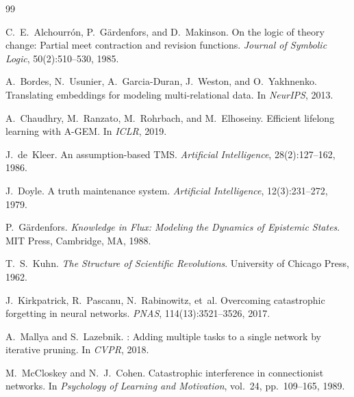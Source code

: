 \documentclass[11pt,a4paper]{article}
\theoremstyle{definition}
\begin{document}

\begin{thebibliography}{99}

C.~E.~Alchourr\'{o}n, P.~G\"ardenfors, and D.~Makinson.
\newblock On the logic of theory change: Partial meet contraction and revision functions.
\newblock \emph{Journal of Symbolic Logic}, 50(2):510--530, 1985.

A.~Bordes, N.~Usunier, A.~Garcia-Duran, J.~Weston, and O.~Yakhnenko.
\newblock Translating embeddings for modeling multi-relational data.
\newblock In \emph{NeurIPS}, 2013.

A.~Chaudhry, M.~Ranzato, M.~Rohrbach, and M.~Elhoseiny.
\newblock Efficient lifelong learning with {A-GEM}.
\newblock In \emph{ICLR}, 2019.

J.~de~Kleer.
\newblock An assumption-based {TMS}.
\newblock \emph{Artificial Intelligence}, 28(2):127--162, 1986.

J.~Doyle.
\newblock A truth maintenance system.
\newblock \emph{Artificial Intelligence}, 12(3):231--272, 1979.

P.~G\"{a}rdenfors.
\newblock \emph{Knowledge in Flux: Modeling the Dynamics of Epistemic States}.
\newblock MIT Press, Cambridge, MA, 1988.

T.~S.~Kuhn.
\newblock \emph{The Structure of Scientific Revolutions}.
\newblock University of Chicago Press, 1962.

J.~Kirkpatrick, R.~Pascanu, N.~Rabinowitz, et~al.
\newblock Overcoming catastrophic forgetting in neural networks.
\newblock \emph{PNAS}, 114(13):3521--3526, 2017.

A.~Mallya and S.~Lazebnik.
: Adding multiple tasks to a single network by iterative pruning.
\newblock In \emph{CVPR}, 2018.

M.~McCloskey and N.~J.~Cohen.
\newblock Catastrophic interference in connectionist networks.
\newblock In \emph{Psychology of Learning and Motivation}, vol.~24, pp.\ 109--165, 1989.


\end{thebibliography}
\end{document}
